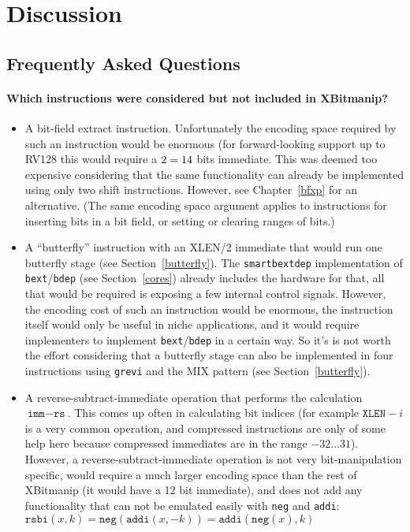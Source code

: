 \chapter{Discussion}

\section{Frequently Asked Questions}

\subsubsection{Which instructions were considered but not included in XBitmanip?}

\begin{itemize}
\item A bit-field extract instruction. Unfortunately the encoding space required
by such an instruction would be enormous (for forward-looking support up to
RV128 this would require a $2 \time 7 = 14$ bits immediate. This was deemed
too expensive considering that the same functionality can already be implemented
using only two shift instructions. However, see Chapter~\ref{bfxp} for an
alternative. (The same encoding space argument applies to instructions for
inserting bits in a bit field, or setting or clearing ranges of bits.)

\item A ``butterfly'' instruction with an XLEN/2 immediate that would run one
butterfly stage (see Section~\ref{butterfly}). The {\tt smartbextdep} implementation
of {\tt bext}/{\tt bdep} (see Section~\ref{cores}) already includes the hardware
for that, all that would be required is exposing a few internal control signals.
However, the encoding cost of such an instruction would be enormous, the
instruction itself would only be useful in niche applications, and it would require
implementers to implement {\tt bext}/{\tt bdep} in a certain way. So it's is
not worth the effort considering that a butterfly stage can also be implemented in
four instructions using {\tt grevi} and the MIX pattern (see Section~\ref{butterfly}).

\item A reverse-subtract-immediate operation that performs the calculation
$\texttt{imm} - \texttt{rs}$.  This comes up often in calculating bit indices
(for example $\texttt{XLEN} - i$ is a very common operation, and compressed
instructions are only of some help here because compressed immediates are in
the range $-32 \dots 31$). However, a reverse-subtract-immediate operation is
not very bit-manipulation specific, would require a much larger encoding
space than the rest of XBitmanip (it would have a 12 bit immediate), and
does not add any functionality that can not be emulated easily with {\tt neg} and
{\tt addi}: $\texttt{rsbi}(x, k) = \texttt{neg}(\texttt{addi}(x, -k)) = \texttt{addi}(\texttt{neg}(x), k)$


\end{itemize}
